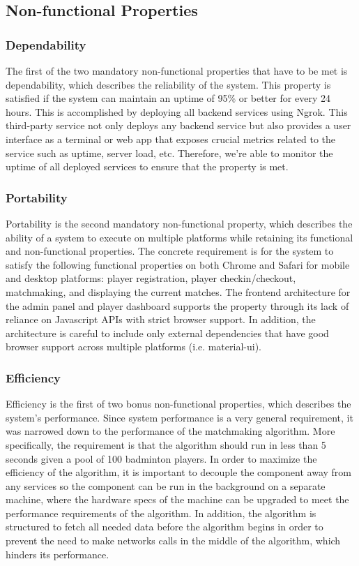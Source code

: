 \documentclass{article}
\begin{document}
\subsection{Non-functional Properties}
\subsubsection{Dependability}
The first of the two mandatory non-functional properties that have to be met is dependability, which describes the reliability of the system. This property is satisfied if the system can maintain an uptime of 95\% or better for every 24 hours. This is accomplished by deploying all backend services using Ngrok. This third-party service not only deploys any backend service but also provides a user interface as a terminal or web app that exposes crucial metrics related to the service such as uptime, server load, etc. Therefore, we're able to monitor the uptime of all deployed services to ensure that the property is met.

\subsubsection{Portability}
Portability is the second mandatory non-functional property, which describes the ability of a system to execute on multiple platforms while retaining its functional and non-functional properties. The concrete requirement is for the system to satisfy the following functional properties on both Chrome and Safari for mobile and desktop platforms: player registration, player checkin/checkout, matchmaking, and displaying the current matches. The frontend architecture for the admin panel and player dashboard supports the property through its lack of reliance on Javascript APIs with strict browser support. In addition, the architecture is careful to include only external dependencies that have good browser support across multiple platforms (i.e. material-ui).

\subsubsection{Efficiency}
Efficiency is the first of two bonus non-functional properties, which describes the system's performance. Since system performance is a very general requirement, it was narrowed down to the performance of the matchmaking algorithm. More specifically, the requirement is that the algorithm should run in less than 5 seconds given a pool of 100 badminton players. In order to maximize the efficiency of the algorithm, it is important to decouple the component away from any services so the component can be run in the background on a separate machine, where the hardware specs of the machine can be upgraded to meet the performance requirements of the algorithm. In addition, the algorithm is structured to fetch all needed data before the algorithm begins in order to prevent the need to make networks calls in the middle of the algorithm, which hinders its performance.
\end{document}
